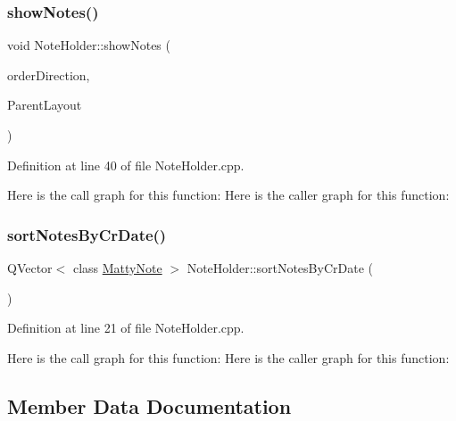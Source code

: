 \subsubsection{\texorpdfstring{show\+Notes()}{showNotes()}}
{\footnotesize\ttfamily void Note\+Holder\+::show\+Notes (\begin{DoxyParamCaption}\item[{int}]{order\+Direction,  }\item[{Q\+V\+Box\+Layout $\ast$}]{Parent\+Layout }\end{DoxyParamCaption})\hspace{0.3cm}{\ttfamily [static]}}



Definition at line 40 of file Note\+Holder.\+cpp.

Here is the call graph for this function\+:
Here is the caller graph for this function\+:
\hypertarget{classNoteHolder_ab52d375cf5ab24f0512fab6308ec8b25}{}\label{classNoteHolder_ab52d375cf5ab24f0512fab6308ec8b25} 
\subsubsection{\texorpdfstring{sort\+Notes\+By\+Cr\+Date()}{sortNotesByCrDate()}}
{\footnotesize\ttfamily Q\+Vector$<$ class \hyperlink{classMattyNote}{Matty\+Note} $>$ Note\+Holder\+::sort\+Notes\+By\+Cr\+Date (\begin{DoxyParamCaption}{ }\end{DoxyParamCaption})\hspace{0.3cm}{\ttfamily [static]}}



Definition at line 21 of file Note\+Holder.\+cpp.

Here is the call graph for this function\+:
Here is the caller graph for this function\+:


\subsection{Member Data Documentation}
\hypertarget{classNoteHolder_a9106819d414e3e131560ef3fcbea4d18}{}\label{classNoteHolder_a9106819d414e3e131560ef3fcbea4d18} 
